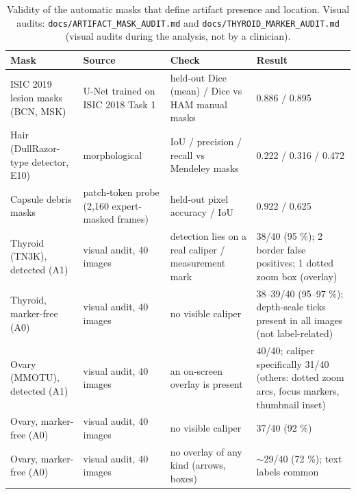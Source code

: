 \begin{table}[H]\centering\scriptsize
\caption{Validity of the automatic masks that define artifact presence and location. Visual audits: \texttt{docs/ARTIFACT\_MASK\_AUDIT.md} and \texttt{docs/THYROID\_MARKER\_AUDIT.md} (visual audits during the analysis, not by a clinician).}\label{tab:det}
\begin{tabular}{p{3.0cm}p{3.0cm}p{3.8cm}p{4.6cm}}\toprule
Mask & Source & Check & Result \\\midrule
ISIC 2019 lesion masks (BCN, MSK) & U-Net trained on ISIC 2018 Task 1 & held-out Dice (mean) / Dice vs HAM manual masks & 0.886 / 0.895 \\
Hair (DullRazor-type detector, E10) & morphological & IoU / precision / recall vs Mendeley masks & 0.222 / 0.316 / 0.472 \\
Capsule debris masks & patch-token probe (2,160 expert-masked frames) & held-out pixel accuracy / IoU & 0.922 / 0.625 \\
Thyroid (TN3K), detected (A1) & visual audit, 40 images & detection lies on a real caliper / measurement mark & 38/40 (95 \%); 2 border false positives; 1 dotted zoom box (overlay) \\
Thyroid, marker-free (A0) & visual audit, 40 images & no visible caliper & 38–39/40 (95–97 \%); depth-scale ticks present in all images (not label-related) \\
Ovary (MMOTU), detected (A1) & visual audit, 40 images & an on-screen overlay is present & 40/40; caliper specifically 31/40 (others: dotted zoom arcs, focus markers, thumbnail inset) \\
Ovary, marker-free (A0) & visual audit, 40 images & no visible caliper & 37/40 (92 \%) \\
Ovary, marker-free (A0) & visual audit, 40 images & no overlay of any kind (arrows, boxes) & $\sim$29/40 (72 \%); text labels common \\
\bottomrule\end{tabular}
\end{table}
